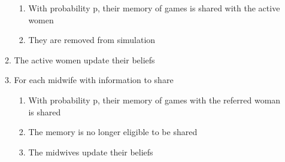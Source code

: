\begin{enumerate}
\begin{enumerate}
\begin{enumerate}
		\item With probability p, their memory of games is shared with the active women
		\item They are removed from simulation
	\end{enumerate}
	\item The active women update their beliefs
	\item For each midwife with information to share
	\begin{enumerate}
		\item With probability p, their memory of games with the referred woman is shared
		\item The memory is no longer eligible to be shared
	\item The midwives update their beliefs
	\end{enumerate}
\end{enumerate}
\end{enumerate}